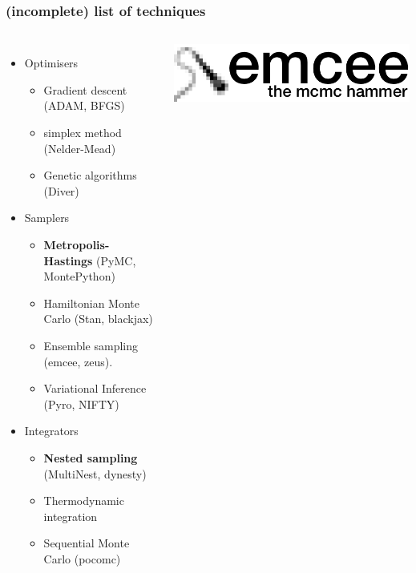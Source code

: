 \documentclass[aspectratio=169,handout]{beamer}
\begin{document}
\begin{frame}
    \frametitle{(incomplete) list of techniques}
    \begin{columns}
        \begin{itemize}
            \item Optimisers
                \begin{itemize}
                    \item Gradient descent (ADAM, BFGS)
                    \item simplex method (Nelder-Mead)
                    \item Genetic algorithms (Diver)
                \end{itemize}
            \item Samplers
                \begin{itemize}
                    \item \textbf{Metropolis-Hastings} (PyMC, MontePython)
                    \item Hamiltonian Monte Carlo (Stan, blackjax)
                    \item Ensemble sampling (emcee, zeus). 
                    \item Variational Inference (Pyro, NIFTY)
                \end{itemize}
            \item Integrators
                \begin{itemize}
                    \item \textbf{Nested sampling} (MultiNest, dynesty)
                    \item Thermodynamic integration
                    \item Sequential Monte Carlo (pocomc)
                \end{itemize}
            \end{itemize}
        \begin{columns}
        \includegraphics[width=\textwidth]{figures/emcee}

\end{columns}
\end{columns}
\end{frame}
\end{document}
